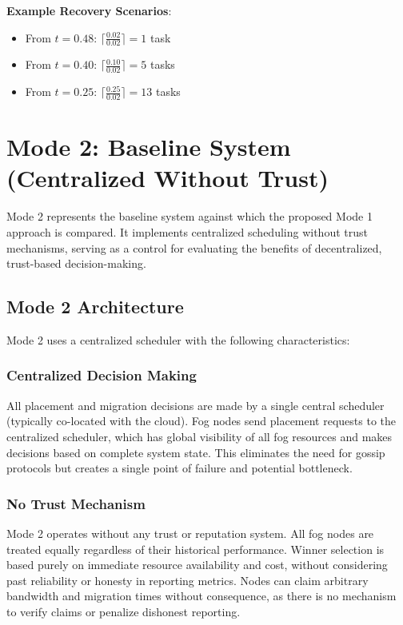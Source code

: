 \documentclass[12pt,a4paper]{article}
\begin{document}
\textbf{Example Recovery Scenarios}:
\begin{itemize}
    \item From $t = 0.48$: $\lceil \frac{0.02}{0.02} \rceil = 1$ task
    \item From $t = 0.40$: $\lceil \frac{0.10}{0.02} \rceil = 5$ tasks
    \item From $t = 0.25$: $\lceil \frac{0.25}{0.02} \rceil = 13$ tasks
\end{itemize}

\section{Mode 2: Baseline System (Centralized Without Trust)}

Mode 2 represents the baseline system against which the proposed Mode 1 approach is compared. It implements centralized scheduling without trust mechanisms, serving as a control for evaluating the benefits of decentralized, trust-based decision-making.

\subsection{Mode 2 Architecture}

Mode 2 uses a centralized scheduler with the following characteristics:

\subsubsection{Centralized Decision Making}

All placement and migration decisions are made by a single central scheduler (typically co-located with the cloud). Fog nodes send placement requests to the centralized scheduler, which has global visibility of all fog resources and makes decisions based on complete system state. This eliminates the need for gossip protocols but creates a single point of failure and potential bottleneck.

\subsubsection{No Trust Mechanism}

Mode 2 operates without any trust or reputation system. All fog nodes are treated equally regardless of their historical performance. Winner selection is based purely on immediate resource availability and cost, without considering past reliability or honesty in reporting metrics. Nodes can claim arbitrary bandwidth and migration times without consequence, as there is no mechanism to verify claims or penalize dishonest reporting.
\end{document}
